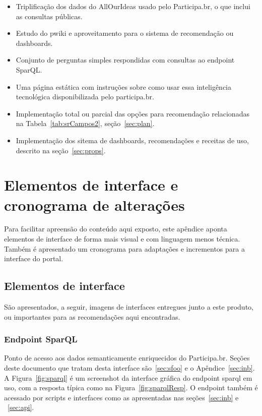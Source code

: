 \documentclass[12pt]{article}
\begin{document}
\begin{itemize}
    \item Triplificação dos dados do AllOurIdeas usado pelo Participa.br, o que inclui as consultas públicas.
    \item Estudo do pwiki e aproveitamento para o sistema de recomendação ou dashboards.
    \item Conjunto de perguntas simples respondidas com consultas ao endpoint SparQL.
    \item Uma página estática com instruções sobre como usar essa inteligência tecnológica disponibilizada pelo participa.br.
    \item Implementação total ou parcial das opções para recomendação relacionadas na Tabela~\ref{tab:srCampos2}, seção~\ref{sec:plan}.
    \item Implementação dos sitema de dashboards, recomendações e receitas de uso, descrito na seção~\ref{sec:props}.
\end{itemize}

\section{Elementos de interface e cronograma de alterações}
Para facilitar apreensão do conteúdo aqui exposto, este apêndice aponta elementos de interface de forma mais visual e com linguagem menos técnica. Também é apresentado um cronograma para adaptações e incrementos para a interface do portal.
\subsection{Elementos de interface}
São apresentados, a seguir, imagens de interfaces entregues junto a este produto, ou importantes para as recomendações aqui encontradas. 
\subsubsection{Endpoint SparQL}
Ponto de acesso aos dados semanticamente enriquecidos do Participa.br. Seções deste documento que tratam desta interface são~\ref{sec:sfoo} e o Apêndice~\ref{sec:inb}. A Figura~\ref{fig:sparql} é um screenshot da interface gráfica do endpoint sparql em uso, com a resposta típica como na Figura~\ref{fig:sparqlResp}. O endpoint também é acessado por scripts e interfaces como as apresentadas nas seções~\ref{sec:inb} e ~\ref{sec:api}.
\end{document}
